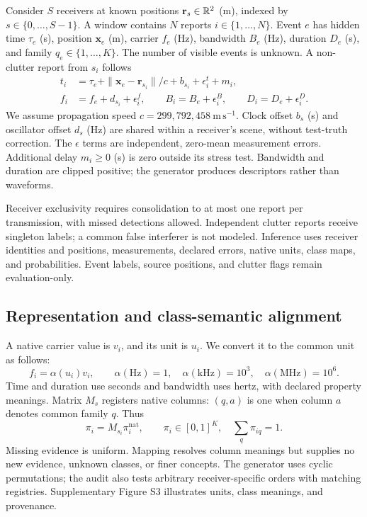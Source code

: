 Consider $S$ receivers at known positions $\mathbf r_s\in\mathbb R^2$ (m), indexed by $s\in\{0,\ldots,S-1\}$. A window contains $N$ reports $i\in\{1,\ldots,N\}$. Event $e$ has hidden time $\tau_e$ (s), position $\mathbf x_e$ (m), carrier $f_e$ (Hz), bandwidth $B_e$ (Hz), duration $D_e$ (s), and family $q_e\in\{1,\ldots,K\}$. The number of visible events is unknown. A non-clutter report from $s_i$ follows
\begin{align}
 t_i&=\tau_e+\|\mathbf x_e-\mathbf r_{s_i}\|/c+b_{s_i}+\epsilon_i^t+m_i,\label{eq:time}\\
 f_i&=f_e+d_{s_i}+\epsilon_i^f,\qquad
 B_i=B_e+\epsilon_i^B,\qquad D_i=D_e+\epsilon_i^D.\label{eq:other}
\end{align}
We assume propagation speed $c=299{,}792{,}458\ \mathrm{m\,s^{-1}}$. Clock offset $b_s$ (s) and oscillator offset $d_s$ (Hz) are shared within a receiver's scene, without test-truth correction. The $\epsilon$ terms are independent, zero-mean measurement errors. Additional delay $m_i\geq0$ (s) is zero outside its stress test. Bandwidth and duration are clipped positive; the generator produces descriptors rather than waveforms.

Receiver exclusivity requires consolidation to at most one report per transmission, with missed detections allowed. Independent clutter reports receive singleton labels; a common false interferer is not modeled. Inference uses receiver identities and positions, measurements, declared errors, native units, class maps, and probabilities. Event labels, source positions, and clutter flags remain evaluation-only.

\subsection{Representation and class-semantic alignment}
A native carrier value is $v_i$, and its unit is $u_i$. We convert it to the common unit as follows:
\begin{equation}
 f_i=\alpha(u_i)v_i,\qquad
 \alpha(\mathrm{Hz})=1,\quad\alpha(\mathrm{kHz})=10^3,\quad\alpha(\mathrm{MHz})=10^6.\label{eq:units}
\end{equation}
Time and duration use seconds and bandwidth uses hertz, with declared property meanings. Matrix $M_s$ registers native columns: $(q,a)$ is one when column $a$ denotes common family $q$. Thus
\begin{equation}
 \pi_i=M_{s_i}\pi_i^{\mathrm{nat}},\qquad
 \pi_i\in[0,1]^K,\quad\sum_q\pi_{iq}=1.\label{eq:class_mapping}
\end{equation}
Missing evidence is uniform. Mapping resolves column meanings but supplies no new evidence, unknown classes, or finer concepts. The generator uses cyclic permutations; the audit also tests arbitrary receiver-specific orders with matching registries. Supplementary Figure S3 illustrates units, class meanings, and provenance.

